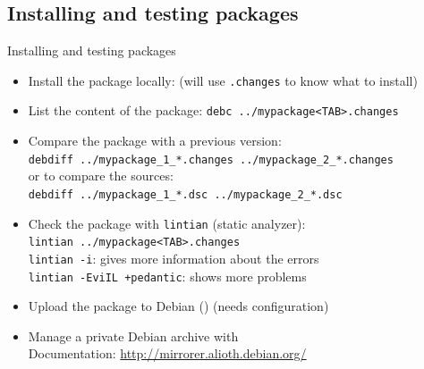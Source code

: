 \documentclass[10pt,final]{beamer}
\begin{document}
\subsection{Installing and testing packages}
\begin{frame}{Installing and testing packages}
  \begin{itemize}
  \item Install the package locally:  (will use \texttt{.changes}
    to know what to install) \br
  \item List the content of the package: \texttt{{\color{rouge}debc}
      ../mypackage<TAB>.changes} \br
  \item Compare the package with a previous version:\\
    \texttt{{\color{rouge}debdiff} ../mypackage\_1\_*.changes ../mypackage\_2\_*.changes}\\
    or to compare the sources:\\
    \texttt{{\color{rouge}debdiff} ../mypackage\_1\_*.dsc ../mypackage\_2\_*.dsc}\\
    \br
  \item Check the package with \texttt{lintian} (static analyzer):\\
    \texttt{{\color{rouge}lintian} ../mypackage<TAB>.changes}\\
    \texttt{lintian -i}: gives more information about the errors \\
    \texttt{lintian -EviIL +pedantic}: shows more problems\br
  \item Upload the package to Debian () (needs configuration) \br
  \item Manage a private Debian archive with \\
    Documentation: \url{http://mirrorer.alioth.debian.org/}
  \end{itemize}
\end{frame}
\end{document}
